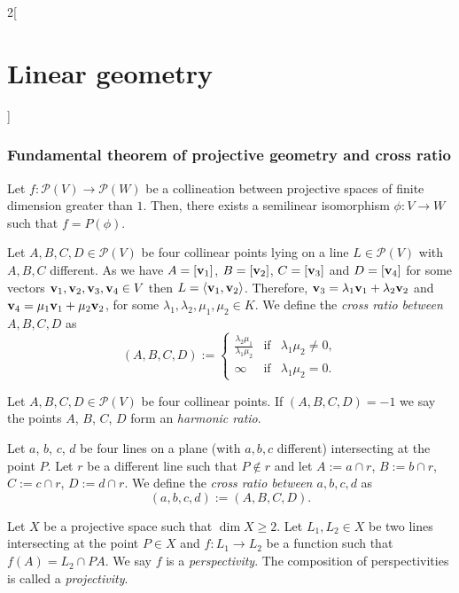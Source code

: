 \documentclass[../../../main.tex]{subfiles}
\begin{document}
\begin{multicols}{2}[\section{Linear geometry}]
    \subsubsection*{Fundamental theorem of projective geometry and cross ratio}
    \begin{theorem}
        Let $f:\mathcal{P}(V)\rightarrow \mathcal{P}(W)$ be a collineation between projective spaces of finite dimension greater than $1$. Then, there exists a semilinear isomorphism $\phi:V\rightarrow W$ such that $f=P(\phi)$.
    \end{theorem}
    \begin{definition}
        Let $A,B,C,D\in\mathcal{P}(V)$ be four collinear points lying on a line $L\in\mathcal{P}(V)$ with $A,B,C$ different. As we have $A=[\vb{v}_1]$, $B=[\vb{v}_2]$, $C=[\vb{v}_3]$ and $D=[\vb{v}_4]$ for some vectors $\vb{v}_1,\vb{v}_2,\vb{v}_3,\vb{v}_4\in V$ then $L=\langle \vb{v}_1,\vb{v}_2\rangle$. Therefore, $\vb{v}_3=\lambda_1\vb{v}_1+\lambda_2\vb{v}_2$ and $\vb{v}_4=\mu_1\vb{v}_1+\mu_2\vb{v}_2$, for some $\lambda_1,\lambda_2,\mu_1,\mu_2\in K$. We define the \textit{cross ratio between $A,B,C,D$} as $$(A,B,C,D):=\left\{
            \begin{array}{ccc}
                \displaystyle\frac{\lambda_2\mu_1}{\lambda_1\mu_2} & \text{if} & \lambda_1\mu_2\ne0, \\
                \infty                                             & \text{if} & \lambda_1\mu_2=0.
            \end{array}\right.$$
    \end{definition}
    \begin{definition}
        Let $A,B,C,D\in\mathcal{P}(V)$ be four collinear points. If $(A,B,C,D)=-1$ we say the points $A$, $B$, $C$, $D$ form an \textit{harmonic ratio}.
    \end{definition}
    \begin{definition}
        Let $a$, $b$, $c$, $d$ be four lines on a plane (with $a,b,c$ different) intersecting at the point $P$. Let $r$ be a different line such that $P\notin r$ and let $A:=a\cap r$, $B:=b\cap r$, $C:=c\cap r$, $D:=d\cap r$. We define the \textit{cross ratio between $a,b,c,d$} as $$(a,b,c,d):=(A,B,C,D).$$
    \end{definition}
    \begin{definition}
        Let $X$ be a projective space such that $\dim X\geq 2$. Let $L_1,L_2\in X$ be two lines intersecting at the point $P\in X$ and $f:L_1\rightarrow L_2$ be a function such that $f(A)=L_2\cap PA$. We say $f$ is a \textit{perspectivity}. The composition of perspectivities is called a \textit{projectivity}.

\end{definition}
\end{multicols}
\end{document}
